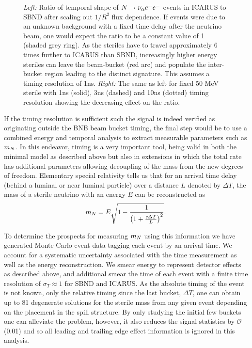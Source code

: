 \documentclass[11pt, a4paper]{article}
\def\ster{\ensuremath N}
\begin{document}
\begin{figure}[t]
\begin{subfigure}[t]{0.5\textwidth}
\end{subfigure}
\caption{\label{fig:icarus_the_great}
\emph{Left: }Ratio of temporal shape of $\ster \rightarrow \nu_\alpha e^+ e^-$ events in ICARUS to SBND after scaling out $1/R^2$ flux dependence. If events were due to an unknown background with a fixed time delay after the neutrino beam, one would expect the ratio to be a constant value of 1 (shaded grey ring). As the steriles have to travel approximately 6 times further to ICARUS than SBND, increasingly higher energy steriles can leave the beam-bucket (red arc) and populate the inter-bucket region leading to the distinct signature. This assumes a timing resolution of 1ns. \emph{Right: } The same as left for fixed 50 MeV sterile with 1ns (solid), 3ns (dashed) and 10ns (dotted) timing resolution showing the decreasing effect on the ratio.   }

\end{figure}

If the timing resolution is sufficient such the signal is indeed verified as
originating outside the BNB beam bucket timing, the final step would be to use a
combined energy and temporal analysis to extract measurable parameters such as
$m_\ster$. In this endeavor, timing is a very important tool, being valid in both the minimal model
as described above but also in extensions in which the total rate has
additional parameters allowing decoupling of the mass from the new degrees of
freedom.  Elementary special relativity tells us that for an arrival time delay
(behind a luminal or near luminal particle) over a distance $L$ denoted by
$\Delta T$, the mass of a sterile neutrino with an energy $E$ can be
reconstructed as 
%
\[ m_{\ster} = E\sqrt{1-\frac{1}{\left(1+\frac{c\Delta T}{L}\right)^2}}. \]

To determine the prospects for measuring $m_{\ster}$ using this information we
have generated Monte Carlo event data tagging each event by an arrival time.
We account for a systematic uncertainty associated with the time measurement as
well as the energy reconstruction. We smear energy to represent detector
effects as described above, and additional smear the time of each event with a
finite time resolution of $\sigma_T  \approx 1$ for SBND and ICARUS. As the
absolute timing of the event is not known, only the relative timing since the
last bucket, $\Delta T$, one can obtain up to 81 degenerate solutions for the
sterile mass from any given event depending on the placement in the spill
structure. By only studying the initial few buckets one can alleviate the
problem, however, it also reduces the signal statistics by $\mathcal{O}$(0.01)
and so all leading and trailing edge effect information is ignored in this analysis.
\end{document}
